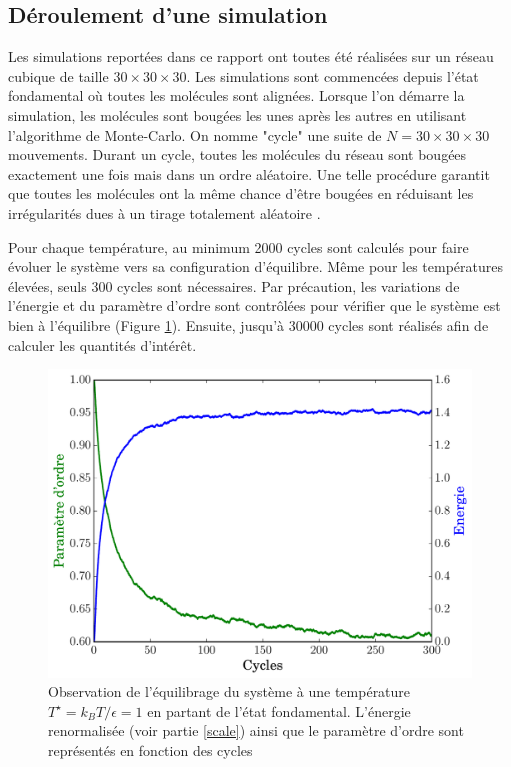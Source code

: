 \documentclass[11pt,a4paper]{article}
\numberwithin{equation}{section}
\begin{document}
\subsection{Déroulement d'une simulation} 
Les simulations reportées dans ce rapport ont toutes été réalisées sur un réseau cubique de taille $30\times 30\times 30$. Les simulations sont commencées depuis l'état fondamental où toutes les molécules sont alignées. Lorsque l'on démarre la simulation, les molécules sont bougées les unes après les autres en utilisant l'algorithme de Monte-Carlo. On nomme "cycle" une suite de $N = 30\times 30\times 30$ mouvements. Durant un cycle, toutes les molécules du réseau sont bougées exactement une fois mais dans un ordre aléatoire. Une telle procédure garantit que toutes les molécules ont la même chance d'être bougées en réduisant les irrégularités dues à un tirage totalement aléatoire \cite{fabbri}. 
\medskip

Pour chaque température, au minimum 2000 cycles sont calculés pour faire évoluer le système vers sa configuration d'équilibre. Même pour les températures élevées, seuls 300 cycles sont nécessaires. Par précaution, les variations de l'énergie et du paramètre d'ordre sont contrôlées pour vérifier que le système est bien à l'équilibre (Figure \ref{equilibrage}). Ensuite, jusqu'à 30000 cycles sont réalisés afin de calculer les quantités d'intérêt.

\begin{figure}[h!]
    \centering	    
	\includegraphics[scale=0.6]{figures/equilibrage.pdf}
    \caption{Observation de l'équilibrage du système à une température $T^\star = k_B T/\epsilon = 1$ en partant de l'état fondamental. L'énergie renormalisée (voir partie \ref{scale}) ainsi que le paramètre d'ordre sont représentés en fonction des cycles}
    	\label{equilibrage} 
\end{figure}
\end{document}
